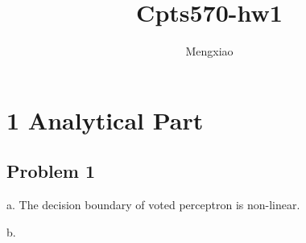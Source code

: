 \documentclass{article}
\author{Mengxiao}
\title{Cpts570-hw1}
\begin{document}
    \maketitle
    \pagebreak
    \section{1 Analytical Part}
        \subsection{Problem 1}
            \par a. The decision boundary of voted perceptron is non-linear.
            \par b. 
\end{document}

